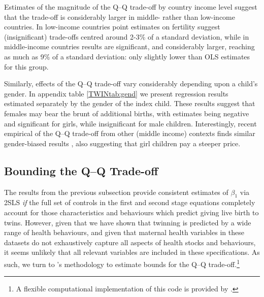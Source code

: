 Estimates of the magnitude of the Q--Q trade-off by country income level suggest 
that the trade-off is considerably larger in middle- rather than low-income 
countries. In low-income countries point estimates on fertility suggest 
(insignificant) trade-offs centred around 2-3\% of a standard deviation, while 
in middle-income countries results are significant, and considerably larger,
reaching as much as 9\% of a standard deviation: only slightly lower than OLS 
estimates for this group.

Similarly, effects of the Q--Q trade-off vary considerably depending upon a 
child's gender. In appendix table \ref{TWINtab:gend} we present regression 
results estimated separately by the gender of the index child. These results 
suggest that females may bear the brunt of additional births, with estimates
being negative and significant for girls, while insignificant for male children. 
Interestingly, recent empirical of the Q--Q trade-off from other (middle income)
contexts finds similar gender-biased results \citep{SouzaPonczek2012}, also
suggesting that girl children pay a steeper price.



\subsection{Bounding the Q--Q Trade-off}           \label{TWINsscn:resultBounds}
The results from the previous subsection provide consistent estimates of 
$\beta_1$ via 2SLS \emph{if} the full set of controls in the first and second 
stage equations completely account for those characteristics and behaviours 
which predict giving live birth to twins. However, given that we have shown that 
twinning is predicted by a wide range of health behaviours, and given that 
maternal health variables in these datasets do not exhaustively capture all 
aspects of health stocks and behaviours, it seems unlikely that all relevant 
variables are included in these specifications. As such, we turn to 
\citeauthor{Conleyetal2012}'s \citeyear{Conleyetal2012} methodology to estimate 
bounds for the Q--Q trade-off.\footnote{A flexible computational implementation
of this code is provided by \citet{Clarke2014b}.}

